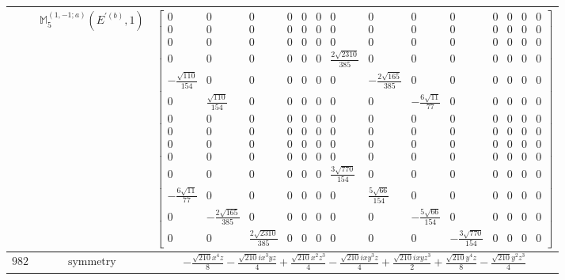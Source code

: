\documentclass[fleqn,8pt,landscape]{jsarticle}
\begin{document}
\begin{longtable}{ccc}
$  $ & $ \mathbb{M}_{5}^{(1,-1;a)}(E^{\prime(b)},1) $ & $ \begin{bmatrix} 0 & 0 & 0 & 0 & 0 & 0 & 0 & 0 & 0 & 0 & 0 & 0 & 0 & 0 \\ 0 & 0 & 0 & 0 & 0 & 0 & 0 & 0 & 0 & 0 & 0 & 0 & 0 & 0 \\ 0 & 0 & 0 & 0 & 0 & 0 & 0 & 0 & 0 & 0 & 0 & 0 & 0 & 0 \\ 0 & 0 & 0 & 0 & 0 & 0 & \frac{2 \sqrt{2310}}{385} & 0 & 0 & 0 & 0 & 0 & 0 & 0 \\ - \frac{\sqrt{110}}{154} & 0 & 0 & 0 & 0 & 0 & 0 & - \frac{2 \sqrt{165}}{385} & 0 & 0 & 0 & 0 & 0 & 0 \\ 0 & \frac{\sqrt{110}}{154} & 0 & 0 & 0 & 0 & 0 & 0 & - \frac{6 \sqrt{11}}{77} & 0 & 0 & 0 & 0 & 0 \\ 0 & 0 & 0 & 0 & 0 & 0 & 0 & 0 & 0 & 0 & 0 & 0 & 0 & 0 \\ 0 & 0 & 0 & 0 & 0 & 0 & 0 & 0 & 0 & 0 & 0 & 0 & 0 & 0 \\ 0 & 0 & 0 & 0 & 0 & 0 & 0 & 0 & 0 & 0 & 0 & 0 & 0 & 0 \\ 0 & 0 & 0 & 0 & 0 & 0 & 0 & 0 & 0 & 0 & 0 & 0 & 0 & 0 \\ 0 & 0 & 0 & 0 & 0 & 0 & \frac{3 \sqrt{770}}{154} & 0 & 0 & 0 & 0 & 0 & 0 & 0 \\ - \frac{6 \sqrt{11}}{77} & 0 & 0 & 0 & 0 & 0 & 0 & \frac{5 \sqrt{66}}{154} & 0 & 0 & 0 & 0 & 0 & 0 \\ 0 & - \frac{2 \sqrt{165}}{385} & 0 & 0 & 0 & 0 & 0 & 0 & - \frac{5 \sqrt{66}}{154} & 0 & 0 & 0 & 0 & 0 \\ 0 & 0 & \frac{2 \sqrt{2310}}{385} & 0 & 0 & 0 & 0 & 0 & 0 & - \frac{3 \sqrt{770}}{154} & 0 & 0 & 0 & 0 \end{bmatrix} $ \\ \hline
$ 982 $ & $ \text{symmetry} $ & $ - \frac{\sqrt{210} x^{4} z}{8} - \frac{\sqrt{210} i x^{3} y z}{4} + \frac{\sqrt{210} x^{2} z^{3}}{4} - \frac{\sqrt{210} i x y^{3} z}{4} + \frac{\sqrt{210} i x y z^{3}}{2} + \frac{\sqrt{210} y^{4} z}{8} - \frac{\sqrt{210} y^{2} z^{3}}{4} $ \\

\end{longtable}
\end{document}
